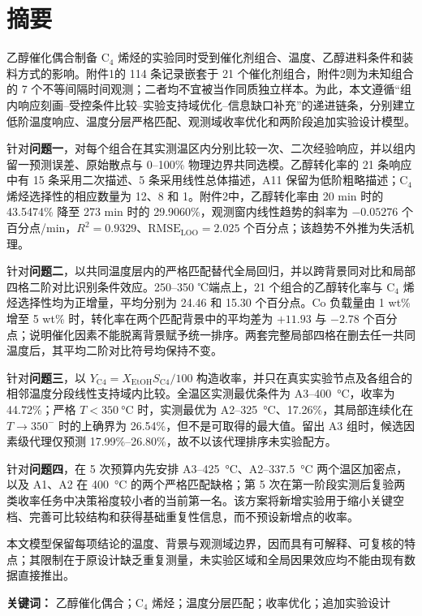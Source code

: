 \begin{center}
  {\heiti{}\bfseries \PaperTitle}
\end{center}
\vspace{0.5em}

\section*{摘要}

乙醇催化偶合制备 $\mathrm{C}_4$ 烯烃的实验同时受到催化剂组合、温度、乙醇进料条件和装料方式的影响。附件1的 114 条记录嵌套于 21 个催化剂组合，附件2则为未知组合的 7 个不等间隔时间观测；二者均不宜被当作同质独立样本。为此，本文遵循“组内响应刻画--受控条件比较--实验支持域优化--信息缺口补充”的递进链条，分别建立低阶温度响应、温度分层严格匹配、观测域收率优化和两阶段追加实验设计模型。

针对\textbf{问题一}，对每个组合在其实测温区内分别比较一次、二次经验响应，并以组内留一预测误差、原始散点与 0--100\% 物理边界共同选模。乙醇转化率的 21 条响应中有 15 条采用二次描述、5 条采用线性总体描述，A11 保留为低阶粗略描述；$\mathrm{C}_4$ 烯烃选择性的相应数量为 12、8 和 1。附件2中，乙醇转化率由 20 min 时的 43.5474\% 降至 273 min 时的 29.9060\%，观测窗内线性趋势的斜率为 $-0.05276$ 个百分点/min，$R^2=0.9329$、$\mathrm{RMSE}_{\mathrm{LOO}}=2.025$ 个百分点；该趋势不外推为失活机理。

针对\textbf{问题二}，以共同温度层内的严格匹配替代全局回归，并以跨背景同对比和局部四格二阶对比识别条件效应。250--350 ℃端点上，21 个组合的乙醇转化率与 $\mathrm{C}_4$ 烯烃选择性均为正增量，平均分别为 24.46 和 15.30 个百分点。Co 负载量由 1 wt\% 增至 5 wt\% 时，转化率在两个匹配背景中的平均差为 $+11.93$ 与 $-2.78$ 个百分点；说明催化因素不能脱离背景赋予统一排序。两套完整局部四格在删去任一共同温度后，其平均二阶对比符号均保持不变。

针对\textbf{问题三}，以 $Y_{\mathrm{C4}}=X_{\mathrm{EtOH}}S_{\mathrm{C4}}/100$ 构造收率，并只在真实实验节点及各组合的相邻温度分段线性支持域内比较。全温区实测最优条件为 A3--\SI{400}{\degreeCelsius}，收率为 44.72\%；严格 $T<\SI{350}{\degreeCelsius}$ 时，实测最优为 A2--\SI{325}{\degreeCelsius}、17.26\%，其局部连续化在 $T\to350^{-}$ 时的上确界为 26.54\%，但不是可取得的最大值。留出 A3 组时，候选因素级代理仅预测 17.99\%--26.80\%，故不以该代理排序未实验配方。

针对\textbf{问题四}，在 5 次预算内先安排 A3--\SI{425}{\degreeCelsius}、A2--\SI{337.5}{\degreeCelsius} 两个温区加密点，以及 A1、A2 在 \SI{400}{\degreeCelsius} 的两个严格匹配缺格；第 5 次在第一阶段实测后复验两类收率任务中决策裕度较小者的当前第一名。该方案将新增实验用于缩小关键空档、完善可比较结构和获得基础重复性信息，而不预设新增点的收率。

本文模型保留每项结论的温度、背景与观测域边界，因而具有可解释、可复核的特点；其限制在于原设计缺乏重复测量，未实验区域和全局因果效应均不能由现有数据直接推出。

\noindent\textbf{关键词：} 乙醇催化偶合；$\mathrm{C}_4$ 烯烃；温度分层匹配；收率优化；追加实验设计
